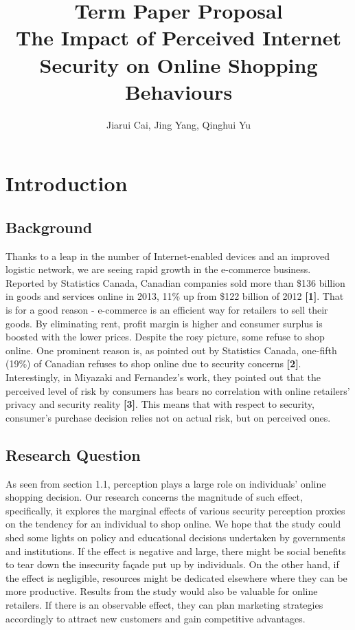 \documentclass[11pt,twoside]{article}
\author{Jiarui Cai, Jing Yang, Qinghui Yu}
\title{Term Paper Proposal\\The Impact of Perceived Internet Security on Online Shopping Behaviours} %
\begin{document}
\maketitle

\section{Introduction}

\subsection{Background}
Thanks to a leap in the number of Internet-enabled devices and an improved logistic network, we are seeing rapid growth in the e-commerce business. Reported by Statistics Canada, Canadian companies sold more than \$136 billion in goods and services online in 2013, 11\% up from \$122 billion of 2012 \textbf{[1]}. That is for a good reason - e-commerce is an efficient way for retailers to sell their goods. By eliminating rent, profit margin is higher and consumer surplus is boosted with the lower prices.
Despite the rosy picture, some refuse to shop online. One prominent reason is, as pointed out by Statistics Canada, one-fifth (19\%) of Canadian refuses to shop online due to security concerns \textbf{[2]}. Interestingly, in Miyazaki and Fernandez's work, they pointed out that the perceived level of risk by consumers has bears no correlation with online retailers' privacy and security reality \textbf{[3]}. This means that with respect to security, consumer's purchase decision relies not on actual risk, but on perceived ones.

\subsection{Research Question}

As seen from section 1.1, perception plays a large role on individuals' online shopping decision. Our research concerns the magnitude of such effect, specifically, it explores the marginal effects of various security perception proxies on the tendency for an individual to shop online. We hope that the study could shed some lights on policy and educational decisions undertaken by governments and institutions. If the effect is negative and large, there might be social benefits to tear down the insecurity façade put up by individuals. On the other hand, if the effect is negligible, resources might be dedicated elsewhere where they can be more productive. Results from the study would also be valuable for online retailers. If there is an observable effect, they can plan marketing strategies accordingly to attract new customers and gain competitive advantages.
\end{document}
